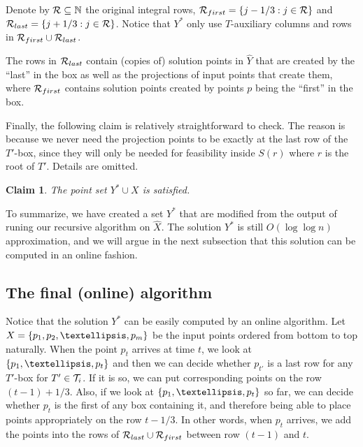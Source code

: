 \documentclass[11pt]{article}
\numberwithin{equation}{section}
\newtheorem{claim}[theorem]{Claim}
\theoremstyle{definition}
\theoremstyle{plain}
\begin{document}
Denote by ${\mathcal R} \subseteq {\mathbb N}$ the original integral rows, ${\mathcal R}_{first}=\left\{ j - 1/3: j \in {\mathcal R} \right\}$ and ${\mathcal R}_{last} = \left\{ j + 1/3: j \in {\mathcal R} \right\}$.
Notice that $Y^*$ only use $T$-auxiliary columns and rows in ${\mathcal R}_{first} \cup {\mathcal R}_{last}$.

\begin{observation}
The rows in ${\mathcal R}_{last}$ contain (copies of) solution points in $\hat{Y}$ that are created by the ``last'' in the box as well as the projections of input points that create them, where ${\mathcal R}_{first}$ contains solution points created by points $p$ being the ``first'' in the box.  
\end{observation}  

Finally, the following claim is relatively straightforward to check. The reason is because we never need the projection points to be exactly at the last row of the $T'$-box, since they will only be needed for feasibility inside $S(r)$ where $r$ is the root of $T'$. 
Details are omitted. 

\begin{claim}
The point set $Y^* \cup X$ is satisfied. 
\end{claim}  

To summarize, we have created a set $Y^*$ that are modified from the output of runing our recursive algorithm on $\hat{X}$. 
The solution $Y^*$ is still $O(\log \log n)$ approximation, and we will argue in the next subsection that this solution can be computed in an online fashion.  
   

\subsection{The final (online) algorithm}  
\label{subsec: online alg}

Notice that the solution $Y^*$ can be easily computed by an online algorithm. Let $X= \set{p_1,p_2,\ldots, p_m}$ be the input points ordered from bottom to top naturally.  
When the point $p_t$ arrives at time $t$, we look at $\set{p_1,\ldots, p_t}$ and then we can decide whether $p_{t'}$ is a last row for any $T'$-box for $T' \in {\mathcal T}_i$. 
If it is so, we can put corresponding points on the row $(t-1) + 1/3$. 
Also, if we look at $\set{p_1,\ldots, p_t}$ so far, we can decide whether $p_t$ is the first of any box containing it, and therefore being able to place points appropriately on the row $t - 1/3$.  
In other words, when $p_t$ arrives, we add the points into the rows of ${\mathcal R}_{last} \cup {\mathcal R}_{first}$ between row $(t-1)$ and $t$.    
 
\end{document}
